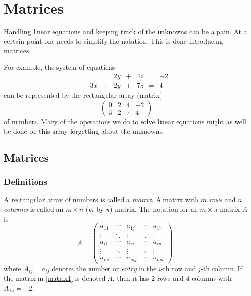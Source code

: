 \documentclass{article}
\begin{document}
\chapter{Matrices}\label{Chapter:Matrices}


Handling linear equations and keeping track of the unknowns can be a pain. At
a certain point one needs to simplify the notation. This is done introducing
matrices. 

For example, the system of equations
\begin{equation}\label{equ2l}
\begin{matrix}
&&  &2y &+ &4z &= &-2\\
&3x &+ &2y &+ &7z &= &4
\end{matrix}
\end{equation}
can be represented by the rectangular array (matrix)
\begin{equation}\label{matrix1} 
\begin{pmatrix}
0 & 2 & 4 & -2\\
3 & 2 & 7 & 4
\end{pmatrix}
\end{equation}
of numbers. Many of the operations we do to solve linear equations might as well be done on this array forgetting
about the unknowns.

\section{Matrices}

\subsection{Definitions}
A rectangular array of numbers is called a \emph{matrix}. A matrix with $m$ \emph{rows} and $n$ 
\emph{columns} is called an $m\times n$ ($m$ by $n$) matrix. 
The notation for an $m\times n$ matrix $A$ is
\begin{equation}\label{matr}
A =  
\begin{pmatrix}
a_{11} & \cdots &a_{1j}& \cdots& a_{1 n} \\
\vdots & \ddots &\vdots & \ddots & \vdots\\
a_{i1} & \cdots &a_{ij}& \cdots& a_{i n} \\
\vdots & \ddots &\vdots & \ddots & \vdots\\
a_{m1} & \cdots &a_{mj}& \cdots& a_{m n}
\end{pmatrix},
\end{equation}
where $A_{ij} = a_{i j}$ denotes the number or \emph{entry} in the  $i$-th row and $j$-th column. If the matrix in \eqref{matrix1}
is denoted $A$, then it has $2$ rows and $4$ columns with $A_{14} = -2$.
\end{document}

